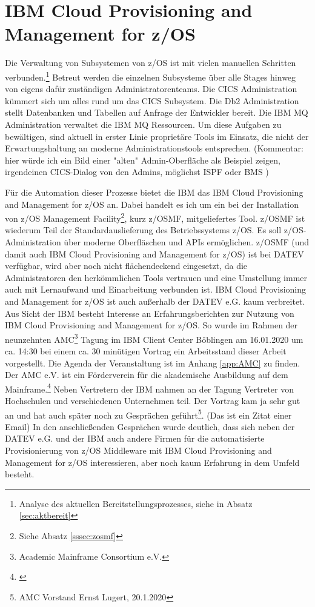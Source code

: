 \section{\glqq IBM Cloud Provisioning and Management for z/OS\grqq}\label{sec:tool}
Die Verwaltung von Subsystemen von z/OS ist mit vielen manuellen Schritten verbunden.\footnote{Analyse des aktuellen Bereitstellungsprozesses, siehe in Absatz \ref{sec:aktbereit}}
Betreut werden die einzelnen Subsysteme über alle Stages hinweg von eigens dafür zuständigen Administratorenteams.
Die \glqq CICS Administration\grqq{} kümmert sich um alles rund um das CICS Subsystem.
Die \glqq Db2 Administration\grqq{} stellt Datenbanken und Tabellen auf Anfrage der Entwickler bereit.
Die \glqq IBM MQ Administration\grqq{} verwaltet die IBM MQ Ressourcen.
Um diese Aufgaben zu bewältigen, sind aktuell in erster Linie proprietäre Tools im Einsatz, die nicht der Erwartungshaltung an moderne Administrationstools entsprechen. (Kommentar: hier würde ich ein Bild einer "alten" Admin-Oberfläche als Beispiel zeigen, irgendeinen CICS-Dialog von den Admins, möglichst ISPF oder BMS )

Für die Automation dieser Prozesse bietet die IBM das \glqq IBM Cloud Provisioning and Management for z/OS\grqq{} an.
Dabei handelt es ich um ein bei der Installation von \glqq z/OS Management Facility\grqq{}\footnote{Siehe Absatz \ref{sssec:zosmf}}, kurz z/OSMF, mitgeliefertes Tool.
z/OSMF ist wiederum Teil der Standardauslieferung des Betriebssystems z/OS.
Es soll z/OS-Administration über moderne Oberfläschen und APIs  ermöglichen.
z/OSMF (und damit auch \glqq IBM Cloud Provisioning and Management for z/OS\grqq) ist bei DATEV verfügbar, wird aber noch nicht flächendeckend eingesetzt, da die Administratoren den herkömmlichen Tools vertrauen und eine Umstellung immer auch mit Lernaufwand und Einarbeitung verbunden ist.
\glqq IBM Cloud Provisioning and Management for z/OS\grqq{} ist auch außerhalb der DATEV e.G. kaum verbreitet. 
Aus Sicht der IBM besteht Interesse an Erfahrungsberichten zur Nutzung von \glqq IBM Cloud Provisioning and Management for z/OS\grqq.
So wurde im Rahmen der neunzehnten \glqq AMC\grqq{}\footnote{Academic Mainframe Consortium e.V.} Tagung im IBM Client Center Böblingen am 16.01.2020 um ca. 14:30  bei einem ca. 30 minütigen Vortrag ein Arbeitsstand dieser Arbeit vorgestellt.
Die Agenda der Veranstaltung ist im Anhang \ref{app:AMC} zu finden.
Der AMC e.V. ist ein Förderverein für die akademische Ausbildung auf dem Mainframe.\footnote{\cite{Amc.23.2.2020}}
Neben Vertretern der IBM nahmen an der Tagung Vertreter von Hochschulen und verschiedenen Unternehmen teil.
Der Vortrag \glqq kam ja sehr gut an und hat auch später noch zu Gesprächen geführt\grqq\footnote{AMC Vorstand Ernst Lugert, 20.1.2020}. (Das ist ein Zitat einer Email)
In den anschließenden Gesprächen wurde deutlich, dass sich neben der DATEV e.G. und der IBM auch andere Firmen für die automatisierte Provisionierung von z/OS Middleware mit \glqq IBM Cloud Provisioning and Management for z/OS\grqq{} interessieren, aber noch kaum Erfahrung in dem Umfeld besteht.

